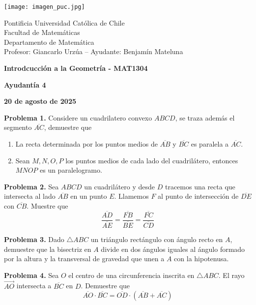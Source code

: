 \documentclass{article}
\begin{document}
\begin{minipage}{2.5cm}
    \texttt{[image: imagen\_puc.jpg]}
\end{minipage}
\begin{minipage}{14cm}
    {\sc Pontificia Universidad Católica de Chile\\
    Facultad de Matemáticas\\
    Departamento de Matemática\\
    Profesor: Giancarlo Urzúa -- Ayudante: Benjamín Mateluna}
\end{minipage}
\vspace{1ex}

{\centerline{\bf Introdcucción a la Geometría - MAT1304}
\centerline{\bf Ayudantía 4}}
\centerline{\bf 20 de agosto de 2025}

\vspace{1cm}
\noindent\textbf{Problema 1.} Considere un cuadrilatero convexo $ABCD$, se traza además el 
segmento $\overline{AC}$, demuestre que
\begin{enumerate}
    \item La recta determinada por los puntos medios de $\overline{AB}$ y $\overline{BC}$ es 
    paralela a $\overline{AC}$.
    
    \item Sean $M,N,O,P$ los puntos medios de cada lado del cuadrilátero, entonces $MNOP$ es un 
    paralelogramo.
\end{enumerate}

\vspace{5mm}
\noindent\textbf{Problema 2.} Sea $ABCD$ un cuadrilátero y desde $D$ tracemos una recta que 
intersecta al lado $\overline{AB}$ en un punto $E$. Llamemos $F$ al punto de intersección de 
$\overline{DE}$ con $\overline{CB}$. Muestre que
\begin{equation*}
    \frac{\overline{AD}}{\overline{AE}}=\frac{\overline{FB}}{\overline{BE}}
    =\frac{\overline{FC}}{\overline{CD}}
\end{equation*}

\vspace{5mm}
\noindent\textbf{Problema 3.} Dado $\triangle ABC$ un triángulo rectángulo con ángulo recto en 
$A$, demuestre que la bisectriz en $A$ divide en dos ángulos iguales al ángulo formado por la 
altura y la transversal de gravedad que unen a $A$ con la hipotenusa.

\vspace{5mm}
\noindent\textbf{Problema 4.} Sea $O$ el centro de una circunferencia inscrita en $\triangle ABC$.
El rayo $\overrightarrow{AO}$ intersecta a $\overline{BC}$ en $D$. Demuestre que
\begin{equation*}
    \overline{AO}\cdot\overline{BC}=\overline{OD}\cdot(\overline{AB}+\overline{AC})
\end{equation*}
\end{document}
